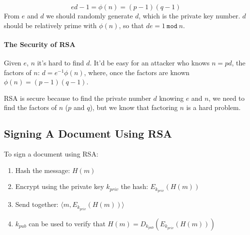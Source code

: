 \documentclass[12pt, letterpaper]{article}
\begin{document}
\[
  e d - 1 = \phi(n) = (p - 1) (q - 1)
\]
From $e$ and $d$ we should randomly generate $d$, which is the private key number.
$d$ should be relatively prime with $\phi(n)$, so that $d e = 1 \: \mathtt{mod} \: n$.

\paragraph{The Security of RSA} Given $e$, $n$ it's hard to find $d$.
It'd be easy for an attacker who knows $n = pd$, the factors of $n$: $d = e^{-1} \phi(n)$, where, once the factors are known $\phi(n) = (p - 1)(q - 1)$.

RSA is secure because to find the private number $d$ knowing $e$ and $n$, we need to find the factors of $n$ ($p$ and $q$), but we know that factoring $n$ is a hard problem.

\subsection{Signing A Document Using RSA}

To sign a document using RSA:
\begin{enumerate}
  \item Hash the message: $H(m)$
  \item Encrypt using the private key $k_{priv}$ the hash: $E_{k_{priv}} (H(m))$
  \item Send together: $\langle m, E_{k_{priv}} (H(m)) \rangle$
  \item $k_{pub}$ can be used to verify that $H(m) = D_{k_{pub}} (E_{k_{priv}} (H(m)))$
\end{enumerate}
\end{document}
